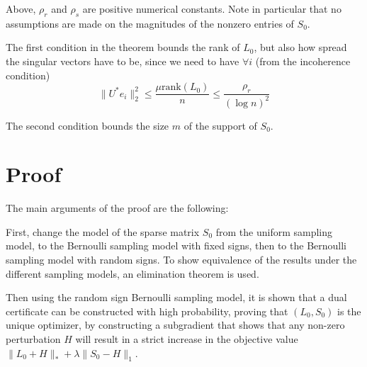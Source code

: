 Above, $\rho_r$ and $\rho_s$ are positive numerical constants. Note in particular that no assumptions are made on the magnitudes of the nonzero entries of $S_0$.

The first condition in the theorem bounds the rank of $L_0$, but also how spread the singular vectors have to be, since we need to have $\forall i$ (from the incoherence condition)
\[
\|U^*e_i\|_2^2 \leq \frac{\mu \text{rank}(L_0)}{n} \leq \frac{\rho_r}{(\log n)^2}
\]

The second condition bounds the size $m$ of the support of $S_0$.
\section{Proof}

The main arguments of the proof are the following:

First, change the model of the sparse matrix $S_0$ from the uniform sampling model, to the Bernoulli sampling model with fixed signs, then to the Bernoulli sampling model with random signs. To show equivalence of the results under the different sampling models, an elimination theorem is used.

Then using the random sign Bernoulli sampling model, it is shown that a dual certificate can be constructed with high probability, proving that $(L_0, S_0)$ is the unique optimizer, by constructing a subgradient that shows that any non-zero perturbation $H$ will result in a strict increase in the objective value $\|L_0 + H\|_* + \lambda \|S_0 - H\|_1$.

